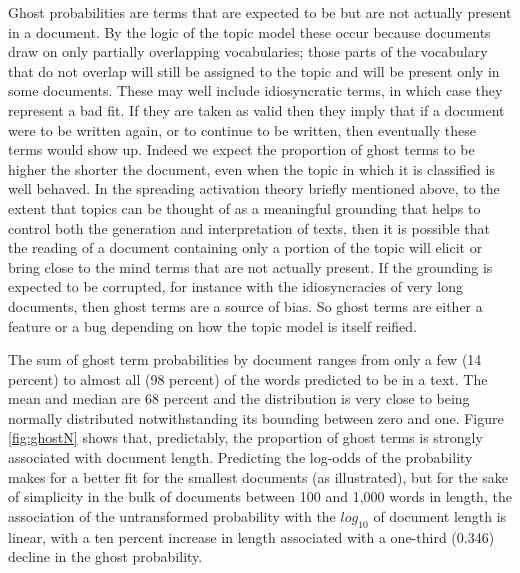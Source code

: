 \documentclass[]{book}
\theoremstyle{definition}
\theoremstyle{definition}
\theoremstyle{definition}
\theoremstyle{remark}
\begin{document}
Ghost probabilities are terms that are expected to be but are not
actually present in a document. By the logic of the topic model these
occur because documents draw on only partially overlapping vocabularies;
those parts of the vocabulary that do not overlap will still be assigned
to the topic and will be present only in some documents. These may well
include idiosyncratic terms, in which case they represent a bad fit. If
they are taken as valid then they imply that if a document were to be
written again, or to continue to be written, then eventually these terms
would show up. Indeed we expect the proportion of ghost terms to be
higher the shorter the document, even when the topic in which it is
classified is well behaved. In the spreading activation theory briefly
mentioned above, to the extent that topics can be thought of as a
meaningful grounding that helps to control both the generation and
interpretation of texts, then it is possible that the reading of a
document containing only a portion of the topic will elicit or bring
close to the mind terms that are not actually present. If the grounding
is expected to be corrupted, for instance with the idiosyncracies of
very long documents, then ghost terms are a source of bias. So ghost
terms are either a feature or a bug depending on how the topic model is
itself reified.

The sum of ghost term probabilities by document ranges from only a few
(14 percent) to almost all (98 percent) of the words predicted to be in
a text. The mean and median are 68 percent and the distribution is very
close to being normally distributed notwithstanding its bounding between
zero and one. Figure \ref{fig:ghostN} shows that, predictably, the
proportion of ghost terms is strongly associated with document length.
Predicting the log-odds of the probability makes for a better fit for
the smallest documents (as illustrated), but for the sake of simplicity
in the bulk of documents between 100 and 1,000 words in length, the
association of the untransformed probability with the \(log_{10}\) of
document length is linear, with a ten percent increase in length
associated with a one-third (0.346) decline in the ghost probability.
\end{document}
